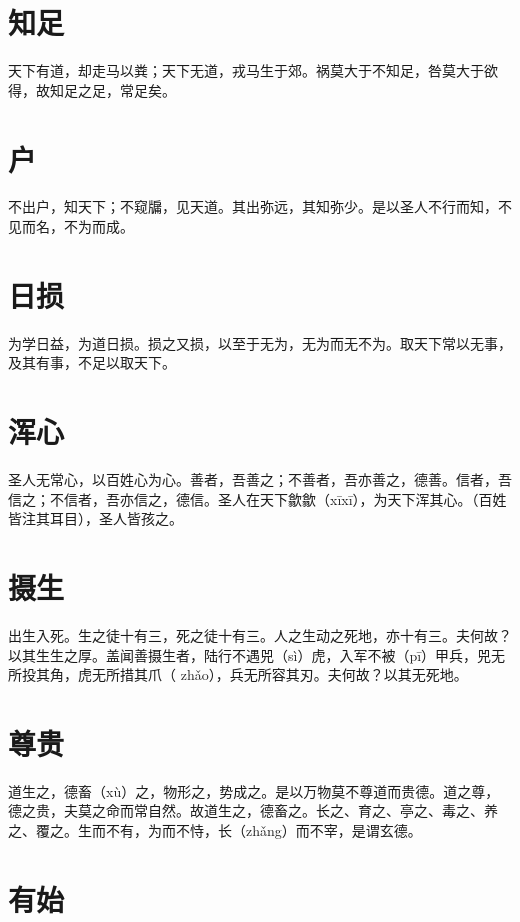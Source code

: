 \documentclass[a4paper,12pt,UTF8,twoside]{ctexbook}
\begin{document}
	
	
	
	\chapter{知足}
	天下有道，却走马以粪；天下无道，戎马生于郊。祸莫大于不知足，咎莫大于欲得，故知足之足，常足矣。
	
	
	
	
	\chapter{户}
	不出户，知天下；不窥牖，见天道。其出弥远，其知弥少。是以圣人不行而知，不见而名，不为而成。
	
	

	\chapter{日损}
		
	为学日益，为道日损。损之又损，以至于无为，无为而无不为。取天下常以无事，及其有事，不足以取天下。
	
	
	

	\chapter{浑心}
	
	圣人无常心，以百姓心为心。善者，吾善之；不善者，吾亦善之，德善。信者，吾信之；不信者，吾亦信之，德信。圣人在天下歙歙（xīxī），为天下浑其心。（百姓皆注其耳目），圣人皆孩之。
	
	
	
	
	\chapter{摄生}
	出生入死。生之徒十有三，死之徒十有三。人之生动之死地，亦十有三。夫何故？以其生生之厚。盖闻善摄生者，陆行不遇兕（sì）虎，入军不被（pī）甲兵，兕无所投其角，虎无所措其爪（	zhǎo），兵无所容其刃。夫何故？以其无死地。
	
	
	
	\chapter{尊贵}
	道生之，德畜（xù）之，物形之，势成之。是以万物莫不尊道而贵德。道之尊，德之贵，夫莫之命而常自然。故道生之，德畜之。长之、育之、亭之、毒之、养之、覆之。生而不有，为而不恃，长（zhǎng）而不宰，是谓玄德。
	\chapter{有始}
	
\end{document}
